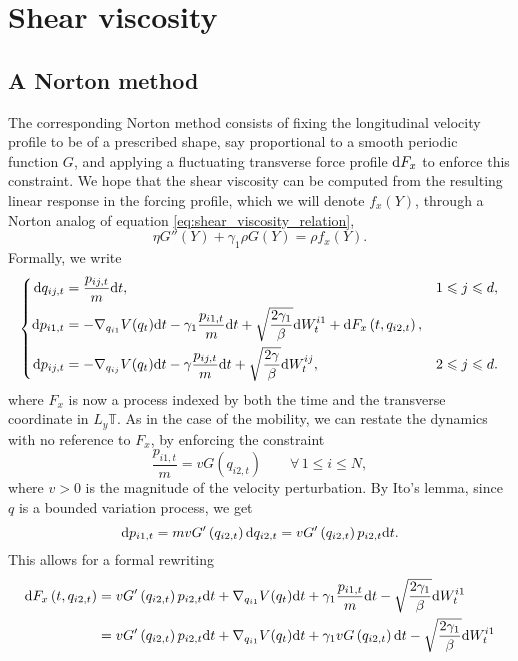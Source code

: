 \section{Shear viscosity}
\subsection{A Norton method}
The corresponding Norton method consists of fixing the longitudinal velocity profile to be of a prescribed shape, say proportional to a smooth periodic function $G$, and applying a 
fluctuating transverse force profile $\mathrm{d} F_x$ to enforce this constraint. We hope that the shear viscosity can be computed from the resulting linear response in the forcing profile, which we will denote $f_x(Y)$, through a Norton analog of equation \eqref{eq:shear_viscosity_relation},
\begin{equation}
    \label{eq:shear_viscosity_relation_norton}
    \eta G''(Y)+\gamma_1 \rho G(Y)=\rho f_x(Y).
\end{equation}
Formally, we write
\begin{equation}
    \left\{\begin{aligned}
        \mathrm{d} q_{ij,t}&=\frac{p_{ij,t}}m\mathrm{d} t,&1\leqslant j\leqslant d,\\
        \mathrm{d} p_{i1,t}&=-\nabla_{q_{i1}}V(q_t)\mathrm{d} t-\gamma_1\frac{p_{i1,t}}m\mathrm{d} t+\sqrt{\frac{2\gamma_1}\beta}\mathrm{d} W_t^{i1}+\mathrm{d} F_x\left(t,q_{i2,t}\right),&\\
        \mathrm{d} p_{ij,t}&=-\nabla_{q_{ij}}V(q_t)\mathrm{d} t-\gamma \frac{p_{ij,t}}m\mathrm{d} t+\sqrt{\frac{2\gamma}\beta}\mathrm{d} W_t^{ij},&2\leqslant j\leqslant d.
    \end{aligned}\right.
\end{equation}
where $F_x$ is now a process indexed by both the time and the transverse coordinate in $L_y \mathbb T$.
As in the case of the mobility, we can restate the dynamics with no reference to $F_x$, by enforcing the constraint
\begin{equation}
    \label{eq:norton_shear_viscosity_constraint}
    \frac{p_{i1,t}}m=vG\left(q_{i2,t}\right)\qquad \forall\, 1\leq i\leq N,
\end{equation}
where $v>0$ is the magnitude of the velocity perturbation.
By Ito's lemma, since $q$ is a bounded variation process, we get
\[\mathrm{d}{p_{i1,t}}=mvG'\left(q_{i2,t}\right)\mathrm{d} q_{i2,t}=vG'\left(q_{i2,t}\right)p_{i2,t}\mathrm{d} t.\]
This allows for a formal rewriting 
\begin{equation}\label{eq:norton_sv_multiplier}
    \begin{aligned}
        \mathrm{d} F_x\left(t,q_{i2,t}\right)&= vG'\left(q_{i2,t}\right)p_{i2,t}\mathrm{d} t+\nabla_{q_{i1}}V(q_t)\mathrm{d} t+\gamma_1\frac{p_{i1,t}}m\mathrm{d} t-\sqrt{\frac{2\gamma_1}\beta}\mathrm{d} W_t^{i1}\\
        &=vG'\left(q_{i2,t}\right)p_{i2,t}\mathrm{d} t+\nabla_{q_{i1}}V(q_t)\mathrm{d} t+\gamma_1vG\left(q_{i2,t}\right)\mathrm{d} t-\sqrt{\frac{2\gamma_1}\beta}\mathrm{d} W_t^{i1}
    \end{aligned}
\end{equation}
